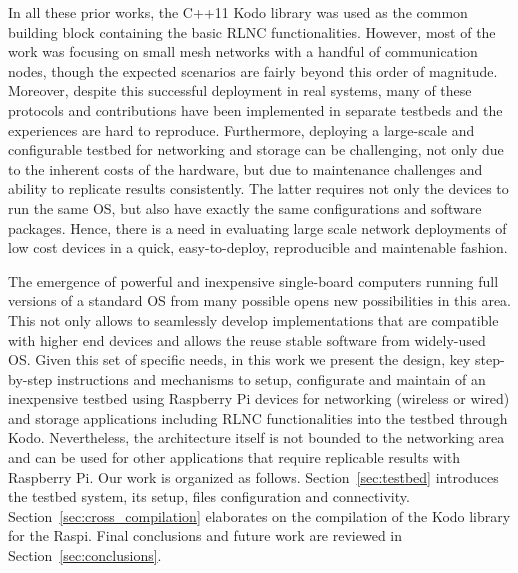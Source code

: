 In all these prior works, the C++11 Kodo library \cite{kodo2011pedersen} was used as the common building block containing the basic \ac{RLNC} functionalities. However, most of the work was focusing on small mesh networks with a handful of communication nodes, though the expected scenarios are fairly beyond this order of magnitude. Moreover, despite this successful deployment in real systems, many of these protocols and contributions have been implemented in separate testbeds and the experiences are hard to reproduce. Furthermore, deploying a large-scale and configurable testbed for networking and storage can be challenging, not only due to the inherent costs of the hardware, but due to maintenance challenges and ability to replicate results consistently. The latter requires not only the devices to run the same \ac{OS}, but also have exactly the same configurations and software packages. Hence, there is a need in evaluating large scale network deployments of low cost devices in a quick, easy-to-deploy, reproducible and maintenable fashion.

The emergence of powerful and inexpensive single-board computers running full versions of a standard \ac{OS} from many possible opens new possibilities in this area. This not only allows to seamlessly develop implementations that are compatible with higher end devices and allows the reuse stable software from widely-used \ac{OS}. Given this set of specific needs, in this work we present the design, key step-by-step instructions and mechanisms to setup, configurate and maintain of an inexpensive testbed using Raspberry Pi devices for networking (wireless or wired) and storage applications including \ac{RLNC} functionalities into the testbed through Kodo. Nevertheless, the architecture itself is not bounded to the networking area and can be used for other applications that require replicable results with Raspberry Pi. Our work is organized as follows. Section~\ref{sec:testbed} introduces the testbed system, its setup, files configuration and connectivity. Section~\ref{sec:cross_compilation} elaborates on the compilation of the Kodo library for the \ac{Raspi}. Final conclusions and future work are reviewed in Section~\ref{sec:conclusions}.

